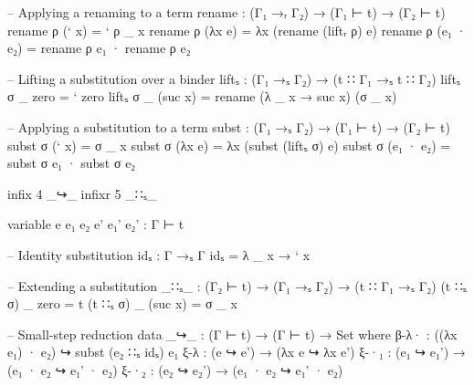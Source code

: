 \begin{frame}
\begin{code}
  -- Applying a renaming to a term
  rename : (Γ₁ →ᵣ Γ₂) → (Γ₁ ⊢ t) → (Γ₂ ⊢ t)
  rename ρ (` x)      = ` ρ _ x
  rename ρ (λx e)     = λx (rename (liftᵣ ρ) e)
  rename ρ (e₁ · e₂)  = rename ρ e₁ · rename ρ e₂
\end{code}
\end{frame}

\begin{frame}
\begin{code}
  -- Lifting a substitution over a binder
  liftₛ : (Γ₁ →ₛ Γ₂) → (t ∷ Γ₁ →ₛ t ∷ Γ₂)
  liftₛ σ _ zero     = ` zero
  liftₛ σ _ (suc x)  = rename (λ _ x → suc x) (σ _ x)
\end{code}
\end{frame}

\begin{frame}
\begin{code}
  -- Applying a substitution to a term
  subst : (Γ₁ →ₛ Γ₂) → (Γ₁ ⊢ t) → (Γ₂ ⊢ t)
  subst σ (` x)      = σ _ x
  subst σ (λx e)     = λx (subst (liftₛ σ) e)
  subst σ (e₁ · e₂)  = subst σ e₁ · subst σ e₂
\end{code}
\end{frame}

\begin{code}[hide]
  infix 4 _↪_
  infixr 5 _∷ₛ_

  variable e e₁ e₂ e' e₁' e₂' : Γ ⊢ t

  -- Identity substitution
  idₛ : Γ →ₛ Γ
  idₛ = λ _ x → ` x

  -- Extending a substitution
  _∷ₛ_ : (Γ₂ ⊢ t) → (Γ₁ →ₛ Γ₂) → (t ∷ Γ₁ →ₛ Γ₂)
  (t ∷ₛ σ) _ zero     = t
  (t ∷ₛ σ) _ (suc x)  = σ _ x

  -- Small-step reduction
  data _↪_ : (Γ ⊢ t) → (Γ ⊢ t) → Set where
    β-λ·  : ((λx e₁) · e₂) ↪ subst (e₂ ∷ₛ idₛ) e₁
    ξ-λ   : (e ↪ e') → (λx e ↪ λx e')
    ξ-·₁  : (e₁ ↪ e₁') → (e₁ · e₂ ↪ e₁' · e₂)
    ξ-·₂  : (e₂ ↪ e₂') → (e₁ · e₂ ↪ e₁' · e₂)
\end{code}
